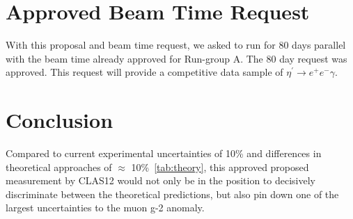 \documentclass[11pt,a4paper,twocolumn]{article}
\def\etaP{\eta^{\prime}}
\def\epem{e^+e^-}
\begin{document}
\section{Approved Beam Time Request}\label{sec:beamrequest}
With this proposal and beam time request, we asked to run for 80 days parallel with the beam time already approved for Run-group A. The 80 day request was approved. This request will provide a competitive data sample of $\etaP \to \epem \gamma$. 
\section{Conclusion}
Compared to current experimental uncertainties of 10\% and differences in theoretical approaches of $\approx$ 10\%~\ref{tab:theory}, this approved proposed measurement by CLAS12 would not only be in the position to decisively discriminate between the theoretical predictions, but also pin down one of the largest uncertainties to the muon g-2 anomaly.								

\clearpage
{} 
{}

	
\end{document}
